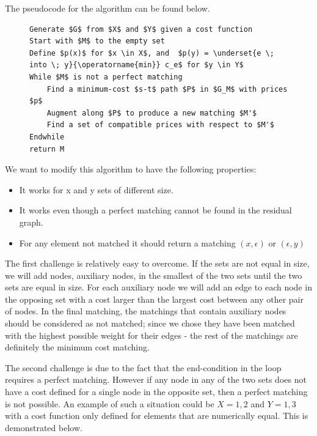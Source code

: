 \documentclass[11pt]{article}
\begin{document}
The pseudocode for the algorithm can be found below.

\begin{figure}
\begin{lstlisting}[mathescape]
Generate $G$ from $X$ and $Y$ given a cost function
Start with $M$ to the empty set
Define $p(x)$ for $x \in X$, and  $p(y) = \underset{e \; into \; y}{\operatorname{min}} c_e$ for $y \in Y$
While $M$ is not a perfect matching
    Find a minimum-cost $s-t$ path $P$ in $G_M$ with prices $p$
    Augment along $P$ to produce a new matching $M'$
    Find a set of compatible prices with respect to $M'$
Endwhile
return M
\end{lstlisting}
\end{figure}

We want to modify this algorithm to have the following properties:

\begin{itemize}
\item It works for x and y sets of different size. 
\item It works even though a perfect matching cannot be found in the residual graph.
\item For any element not matched it should return a matching $(x, \epsilon)$ or $(\epsilon, y)$
\end{itemize}

The first challenge is relatively easy to overcome. If the sets are not equal in size, we will add nodes, auxiliary nodes, in the smallest of the two sets until the two sets are equal in size. For each auxiliary node we will add an edge to each node in the opposing set with a cost larger than the largest cost between any other pair of nodes. In the final matching, the matchings that contain auxiliary nodes should be considered as not matched; since we chose they have been matched with the highest possible weight for their edges - the rest of the matchings are definitely the minimum cost matching.

The second challenge is due to the fact that the end-condition in the loop requires a perfect matching. However if any node in any of the two sets does not have a cost defined for a single node in the opposite set, then a perfect matching is not possible. An example of such a situation could be $X={1, 2}$ and $Y={1, 3}$ with a cost function only defined for elements that are numerically equal. This is demonstrated below. \\
\end{document}
